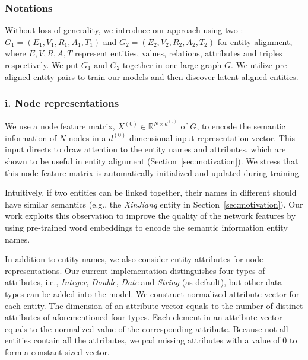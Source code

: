 \subsubsection{Notations}

Without loss of generality, we introduce our approach using two \KGs: $G_1 = (E_1,V_1,R_1,A_1,T_1)$ and $G_2 = (E_2,V_2,R_2,A_2,T_2)$ for
entity alignment, where $E,V,R,A,T$ represent entities, values, relations, attributes and triples respectively. 	We put $G_1$ and $G_2$
together in one large graph $G$. We utilize pre-aligned entity pairs to train our models and then discover latent aligned entities.

%



\subsubsection{i. Node representations}
	\label{subsection:Node Representations}
   We use a node feature matrix, $X^{(0)} \in \mathbb{R}^{N \times d^{(0)}}$ of $G$, to encode the semantic information of $N$  nodes in a $d^{(0)}$ dimensional input representation vector.
   This input directs \RGCN to draw attention to the entity names and attributes, which are shown to be useful in entity
   alignment (Section~\ref{sec:motivation}). We stress that this node feature matrix is automatically initialized and updated during training.

	
	\label{wordvector}
	Intuitively, if two entities can be linked together, their names in different \KGs should have similar semantics (e.g., the \emph{XinJiang} entity in Section~\ref{sec:motivation}).
    Our work exploits this observation to improve the quality of the network features by using pre-trained word embeddings to encode the semantic
    information entity names.

	
    In addition to entity names, we also consider entity attributes for node representations.
	Our current implementation distinguishes four types of attributes, i.e., \emph{Integer}, \emph{Double}, \emph{Date} and \emph{String}
(as default), but other data types can be added into the model.
%	
	We construct normalized attribute vector for each entity. The dimension of an attribute vector equals to the number of distinct attributes of aforementioned four types.
	Each element in an attribute vector equals to the normalized value of the corresponding attribute.
    Because not all entities contain all the attributes, we pad missing attributes with a value of 0 to form a constant-sized vector.

